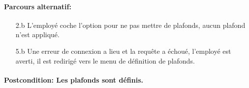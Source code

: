 \documentclass[../annexe.tex]{subfiles}
\begin{document}
        \paragraph{Parcours alternatif:} 
        \begin{itemize}
            \item[2.b] L’employé coche l’option pour ne pas mettre de plafonds, aucun plafond n'est appliqué.
            \item[5.b] Une erreur de connexion a lieu et la requête a échoué, l’employé est averti, il est redirigé vers le menu de définition de plafonds.
        \end{itemize} 
            \paragraph{Postcondition: Les plafonds sont définis.}
    
\end{document}
